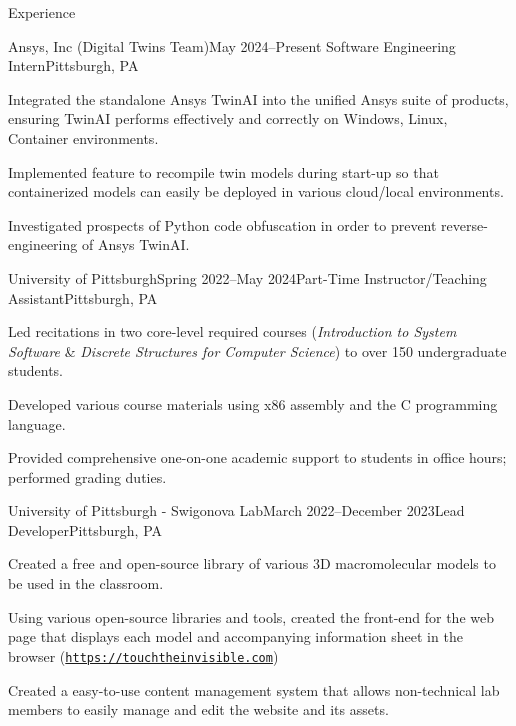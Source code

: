 \begin{rSection}{Experience}
    \begin{rSubsection}{Ansys, Inc (Digital Twins Team)}{May 2024–Present}
    {Software Engineering Intern}{Pittsburgh, PA}
        \item Integrated the standalone Ansys TwinAI into the unified Ansys suite of products, ensuring TwinAI performs effectively and correctly on  Windows, Linux, Container environments. 
        \item Implemented feature to recompile twin models during start-up so that containerized models can easily be deployed in various cloud/local environments.
        \item Investigated prospects of Python code obfuscation in order to prevent reverse-engineering of Ansys TwinAI.
    \end{rSubsection}
  
    \begin{rSubsection}{University of Pittsburgh}{Spring 2022–May 2024}{Part-Time Instructor/Teaching Assistant}{Pittsburgh, PA}
        \item Led recitations in two core-level required courses (\textit{Introduction to System Software} \& \textit{Discrete Structures for Computer Science}) to over 150 undergraduate students.
        \item Developed various course materials using x86 assembly and the C programming language.
        \item Provided comprehensive one-on-one academic support to students in office hours; performed grading duties.
    \end{rSubsection}

    \begin{rSubsection}{University of Pittsburgh - Swigonova Lab}{March 2022–December 2023}{Lead Developer}{Pittsburgh, PA}
        \item Created a free and open-source library of various 3D macromolecular models to be used in the classroom.
        \item Using various open-source libraries and tools, created the front-end for the web page that displays each model and accompanying information sheet in the browser (\href{https://touchtheinvisible.com}{\nolinkurl{https://touchtheinvisible.com}})
        \item Created a easy-to-use content management system that allows non-technical lab members to easily manage and edit the website and its assets.
    \end{rSubsection}
    
  
  \end{rSection}